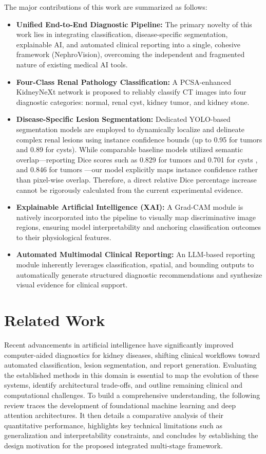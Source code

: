 \documentclass[]{elsarticle}
\begin{document}
The major contributions of this work are summarized as follows:
\begin{itemize}
    \item \textbf{Unified End-to-End Diagnostic Pipeline:} The primary novelty of this work lies in integrating classification, disease-specific segmentation, explainable AI, and automated clinical reporting into a single, cohesive framework (NephroVision), overcoming the independent and fragmented nature of existing medical AI tools.
    \item \textbf{Four-Class Renal Pathology Classification:} A PCSA-enhanced KidneyNeXt network is proposed to reliably classify CT images into four diagnostic categories: normal, renal cyst, kidney tumor, and kidney stone.
    \item \textbf{Disease-Specific Lesion Segmentation:} Dedicated YOLO-based segmentation models are employed to dynamically localize and delineate complex renal lesions using instance confidence bounds (up to 0.95 for tumors and 0.89 for cysts). While comparable baseline models utilized semantic overlap—reporting Dice scores such as 0.829 for tumors and 0.701 for cysts \cite{zhao2023automatic}, and 0.846 for tumors \cite{abdelrahman2023efficientnet}—our model explicitly maps instance confidence rather than pixel-wise overlap. Therefore, a direct relative Dice percentage increase cannot be rigorously calculated from the current experimental evidence.
    \item \textbf{Explainable Artificial Intelligence (XAI):} A Grad-CAM module is natively incorporated into the pipeline to visually map discriminative image regions, ensuring model interpretability and anchoring classification outcomes to their physiological features.
    \item \textbf{Automated Multimodal Clinical Reporting:} An LLM-based reporting module inherently leverages classification, spatial, and bounding outputs to automatically generate structured diagnostic recommendations and synthesize visual evidence for clinical support.
\end{itemize}

\section{Related Work}
\label{sec:lit_review}

Recent advancements in artificial intelligence have significantly improved computer-aided diagnostics for kidney diseases, shifting clinical workflows toward automated classification, lesion segmentation, and report generation. Evaluating the established methods in this domain is essential to map the evolution of these systems, identify architectural trade-offs, and outline remaining clinical and computational challenges. To build a comprehensive understanding, the following review traces the development of foundational machine learning and deep attention architectures. It then details a comparative analysis of their quantitative performance, highlights key technical limitations such as generalization and interpretability constraints, and concludes by establishing the design motivation for the proposed integrated multi-stage framework.
\end{document}
